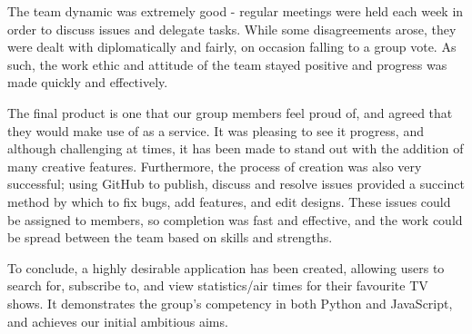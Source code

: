 \documentclass[12pt, a4paper]{article}
\begin{document}
The team dynamic was extremely good - regular meetings were held each week in order to discuss issues and delegate tasks. While some disagreements arose, they were dealt with diplomatically and fairly, on occasion falling to a group vote. As such, the work ethic and attitude of the team stayed positive and progress was made quickly and effectively.

The final product is one that our group members feel proud of, and agreed that they would make use of as a service. It was pleasing to see it progress, and although challenging at times, it has been made to stand out with the addition of many creative features. Furthermore, the process of creation was also very successful; using GitHub to publish, discuss and resolve issues provided a succinct method by which to fix bugs, add features, and edit designs. These issues could be assigned to members, so completion was fast and effective, and the work could be spread between the team based on skills and strengths.

To conclude, a highly desirable application has been created, allowing users to search for, subscribe to, and view statistics/air times for their favourite TV shows. It demonstrates the group's competency in both Python and JavaScript, and achieves our initial ambitious aims.
\end{document}
